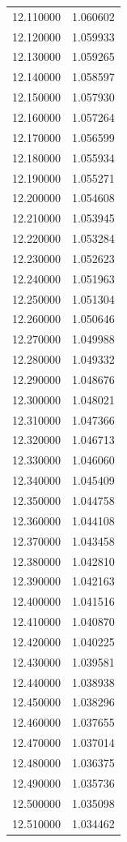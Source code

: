 \begin{tabular}{rr}
12.110000 & 1.060602 \\
12.120000 & 1.059933 \\
12.130000 & 1.059265 \\
12.140000 & 1.058597 \\
12.150000 & 1.057930 \\
12.160000 & 1.057264 \\
12.170000 & 1.056599 \\
12.180000 & 1.055934 \\
12.190000 & 1.055271 \\
12.200000 & 1.054608 \\
12.210000 & 1.053945 \\
12.220000 & 1.053284 \\
12.230000 & 1.052623 \\
12.240000 & 1.051963 \\
12.250000 & 1.051304 \\
12.260000 & 1.050646 \\
12.270000 & 1.049988 \\
12.280000 & 1.049332 \\
12.290000 & 1.048676 \\
12.300000 & 1.048021 \\
12.310000 & 1.047366 \\
12.320000 & 1.046713 \\
12.330000 & 1.046060 \\
12.340000 & 1.045409 \\
12.350000 & 1.044758 \\
12.360000 & 1.044108 \\
12.370000 & 1.043458 \\
12.380000 & 1.042810 \\
12.390000 & 1.042163 \\
12.400000 & 1.041516 \\
12.410000 & 1.040870 \\
12.420000 & 1.040225 \\
12.430000 & 1.039581 \\
12.440000 & 1.038938 \\
12.450000 & 1.038296 \\
12.460000 & 1.037655 \\
12.470000 & 1.037014 \\
12.480000 & 1.036375 \\
12.490000 & 1.035736 \\
12.500000 & 1.035098 \\
12.510000 & 1.034462 \\

\end{tabular}
